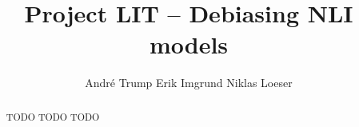 \documentclass[11pt]{article}
\title{Project LIT -- Debiasing \acs{NLI} models}
\author{André Trump \And
  Erik Imgrund \And
  Niklas Loeser }
\begin{document}


\maketitle
\begin{abstract}
TODO TODO TODO
\end{abstract}









\end{document}
